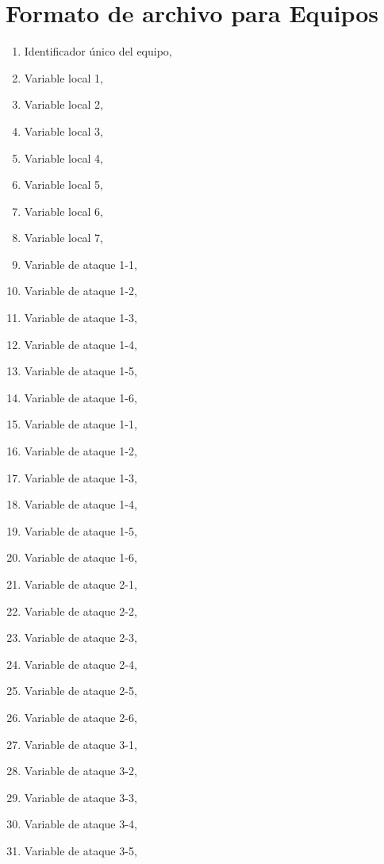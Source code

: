 \section{Formato de archivo para Equipos}
\begin{multicols}{2}
	\begin{enumerate}
	    \setlength{\itemsep}{1pt}
	    \setlength{\parskip}{0pt}
	    \setlength{\parsep}{0pt}
		\item Identificador único del equipo, 
		\item Variable local 1,
		\item Variable local 2,
		\item Variable local 3,
		\item Variable local 4,
		\item Variable local 5,
		\item Variable local 6,
		\item Variable local 7,
		\item Variable de ataque 1-1, 
		\item Variable de ataque 1-2,
		\item Variable de ataque 1-3, 
		\item Variable de ataque 1-4, 
		\item Variable de ataque 1-5, 
		\item Variable de ataque 1-6, 
		\item Variable de ataque 1-1, 
		\item Variable de ataque 1-2, 
		\item Variable de ataque 1-3, 
		\item Variable de ataque 1-4, 
		\item Variable de ataque 1-5, 
		\item Variable de ataque 1-6,
		\item Variable de ataque 2-1,
		\item Variable de ataque 2-2,
		\item Variable de ataque 2-3,
		\item Variable de ataque 2-4,
		\item Variable de ataque 2-5, 
		\item Variable de ataque 2-6, 
		\item Variable de ataque 3-1, 
		\item Variable de ataque 3-2, 
		\item Variable de ataque 3-3, 
		\item Variable de ataque 3-4, 
		\item Variable de ataque 3-5, 

\end{enumerate}
\end{multicols}
